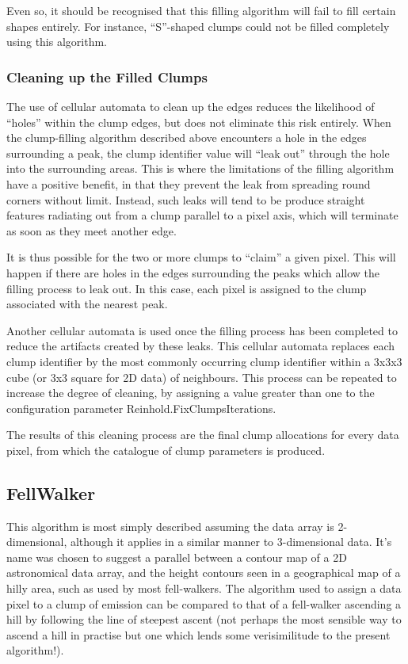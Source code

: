 \documentclass[twoside,11pt]{article}
\newcommand{\xlabel}[1]{}
\renewcommand{\_}{\texttt{\symbol{95}}}
\begin{document}
Even so, it should be recognised that this filling algorithm will fail to
fill certain shapes entirely. For instance, ``S''-shaped clumps could not
be filled completely using this algorithm.

\subsubsection{Cleaning up the Filled Clumps}
The use of cellular automata to clean up the edges reduces the likelihood
of ``holes'' within the clump edges, but does not eliminate this risk
entirely. When the clump-filling algorithm described above encounters a
hole in the edges surrounding a peak, the clump identifier value will 
``leak out'' through the hole into the surrounding areas. This is where the
limitations of the filling algorithm have a positive benefit, in that they
prevent the leak from spreading round corners without limit. Instead, such 
leaks will tend to be produce straight features radiating out from a clump
parallel to a pixel axis, which will terminate as soon as they meet another 
edge.

It is thus possible for the two or more clumps to ``claim'' a given
pixel. This will happen if there are holes in the edges surrounding the 
peaks which allow the filling process to leak out. In this case, each
pixel is assigned to the clump associated with the nearest peak.

Another cellular automata is used once the filling process has been
completed to reduce the artifacts created by these leaks. This cellular
automata replaces each clump identifier by the most commonly occurring
clump identifier within a 3x3x3 cube (or 3x3 square for 2D data) of
neighbours. This process can be repeated to increase the degree of
cleaning, by assigning a value greater than one to the configuration
parameter Reinhold.FixClumpsIterations.

The results of this cleaning process are the final clump allocations for
every data pixel, from which the catalogue of clump parameters is produced.

\subsection{\xlabel{fellwalker}FellWalker}
This algorithm is most simply described assuming the data array is
2-dimensional, although it applies in a similar manner to 3-dimensional
data. It's name was chosen to suggest a parallel between a contour map of
a 2D astronomical data array, and the height contours seen in a geographical
map of a hilly area, such as used by most fell-walkers. The algorithm
used to assign a data pixel to a clump of emission can be compared to
that of a fell-walker ascending a hill by following the line of steepest
ascent (not perhaps the most sensible way to ascend a hill in practise
but one which lends some verisimilitude to the present algorithm!).
\end{document}

